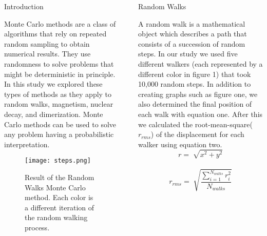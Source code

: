 \documentclass[final]{beamer}
\newlength{\sepwid}
\newlength{\onecolwid}
\begin{document}
\begin{frame}[t]
\begin{columns}[t]
\begin{column}{\onecolwid}
\begin{block}{Introduction}

Monte Carlo methods are a class of algorithms that rely on repeated random sampling to obtain numerical results. They use randomness to solve problems that might be deterministic in principle. In this study we explored these types of methods as they apply to random walks, magnetism, nuclear decay, and dimerization. Monte Carlo methods can be used to solve any problem having a probabilistic interpretation.

\end{block}


\begin{figure}
\texttt{[image: steps.png]}
\caption{Result of the Random Walks Monte Carlo method. Each color is a different iteration of the random walking process.}
\end{figure}


\end{column} %

\begin{column}{\sepwid}\end{column} %

\begin{column}{\onecolwid} %


\begin{block}{Random Walks}

A random walk is a mathematical object which describes a path that consists of a succession of random steps.
In our study we used five different walkers (each represented by a different color in figure 1) that took 10,000 random steps. In addition to creating graphs such as figure one, we also determined the final position of each walk with equation one. After this we calculated the root-mean-square($r_{rms}$) of the displacement for each walker using equation two.
\begin{equation}
r = \sqrt[]{x^{2}+y^{2}}
\end{equation}
\\
\begin{equation}
r_{rms} = \sqrt[]{\dfrac{\sum\limits_{i=1}^{N_{walks}}r_{i}^{2}}{N_{walks}}}
\end{equation}


\end{block}
\end{column}
\end{columns}
\end{frame}
\end{document}
